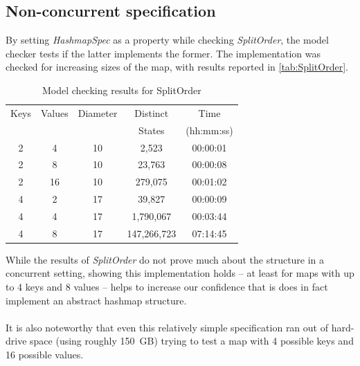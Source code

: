 \documentclass{uit-thesis}
\begin{document}
\subsection{Non-concurrent specification}
By setting \textit{HashmapSpec} as a property while checking \textit{SplitOrder}, the model checker tests if the latter implements the former. The implementation was checked for increasing sizes of the map, with results reported in \autoref{tab:SplitOrder}.
\begin{table}[h]
    \centering
    \begin{tabular}{ |c|c||c|c|c| }
        \hline
        Keys & Values & Diameter & Distinct & Time \\
        &        &          & States   & (hh:mm:ss)\\
        \hline
        2 & 4  & 10 & 2,523      & 00:00:01\\
        2 & 8  & 10 & 23,763     & 00:00:08\\
        2 & 16 & 10 & 279,075    & 00:01:02\\
        4 & 2  & 17 & 39,827     & 00:00:09\\
        4 & 4  & 17 & 1,790,067  & 00:03:44\\
        4 & 8  & 17 & 147,266,723& 07:14:45\\
        \hline
    \end{tabular}
    \caption{Model checking results for SplitOrder}
    \label{tab:SplitOrder}
\end{table}
While the results of \textit{SplitOrder} do not prove much about the structure in a concurrent setting, showing this implementation holds -- at least for maps with up to 4 keys and 8 values -- helps to increase our confidence that is does in fact implement an abstract hashmap structure.
\\\\
It is also noteworthy that even this relatively simple specification ran out of hard-drive space (using roughly 150~GB) trying to test a map with 4 possible keys and 16 possible values.
\end{document}
